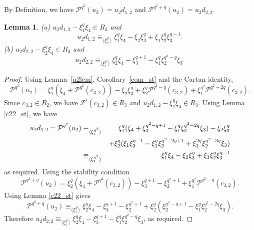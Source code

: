 \documentclass{amsart}
\newcommand{\PP}{\mathcal{P}}
\newtheorem{lem}[subsection]{Lemma}
\begin{document}
By Definition, we have $\PP^{q^2}(u_2)=u_2d_{1,2}$ and $\PP^{q^2+q}(u_2)=u_2d_{2,2}$.


\begin{lem}\label{u2dlem} (a) $u_2d_{1,2}-\xi_1^q\xi_4\in R_3$ and
 $$u_2d_{1,2}\equiv_{\langle \xi_1^{q^2}\rangle} \xi_1^q\xi_4-\xi_2\xi_3^q+\xi_1\xi_2^q\xi_3^{q-1}.$$
 (b) $u_2d_{2,2}-\xi_2^q\xi_4\in R_3$ and
 $$u_2d_{2,2}\equiv_{\langle \xi_1^{q^2}\rangle} \xi_2^q\xi_4-\xi_3^{q+1}-\xi_1^q\xi_2^{q^2-q}\xi_3.$$
 \end{lem}
 
 \begin{proof} Using Lemma~\ref{u2lem}, Corollary~\ref{com_st} and the Cartan identity, 
 $$\PP^{q^2}(u_2)=\xi_1^q(\xi_4 +\PP^{q^2}(c_{3,2}))-\xi_2\xi_3^q+\xi_2^q\PP^{q^2-q}(c_{3,2})+\xi_1^{q^2}\PP^{q^2-2q}(c_{3,2}).$$
 Since $c_{3,2}\in R_2$, we have $\PP^i(c_{3,2})\in R_3$ and $u_2d_{1,2}-\xi_1^q\xi_4\in R_3$.
 Using Lemma \ref{c22_st}, we have 
 \begin{eqnarray*}u_2d_{1,2}=\PP^{q^2}(u_2)&\equiv_{\langle \xi_1^{q^2}\rangle} &\xi_1^q(\xi_4 +\xi_2^{q^2-q+1}-\xi_1^q\xi_2^{q^2-2q}\xi_3) -\xi_2\xi_3^q\cr
 &&+\xi_2^q(\xi_1\xi_3^{q-1}-\xi_1^q\xi_2^{q^2-2q+1}+\xi_1^{2q}\xi_2^{q^2-3q}\xi_3 )\cr
 &\equiv_{\langle \xi_1^{q^2}\rangle} & \xi_1^q\xi_4  -\xi_2\xi_3^q+\xi_1\xi_2^q\xi_3^{q-1}
 \end{eqnarray*}
 as required. 
 Using the stability condition
 $$ \PP^{q^2+q}(u_2)=\xi_2^q(\xi_4+\PP^{q^2}(c_{3,2}))-\xi_3^{q+1}-\xi_2^{q^2+1}+\xi_1^{q^2}\PP^{q^2-q}(c_{3,2}).$$
 Using Lemma \ref{c22_st} gives
 $$\PP^{q^2+q}(u_2)\equiv_{\langle \xi_1^{q^2}\rangle} \xi_2^q\xi_4 -\xi_3^{q+1} -\xi_2^{q^2+1}+\xi_2^q(\xi_2^{q^2-q+1}-\xi_1^q\xi_2^{q^2-2q}\xi_3).$$
 Therefore $u_2d_{2,2} \equiv_{\langle \xi_1^{q^2}\rangle} \xi_2^q\xi_4-\xi_3^{q+1}-\xi_1^q\xi_2^{q^2-q}\xi_3$, as required.
 \end{proof}
\end{document}
